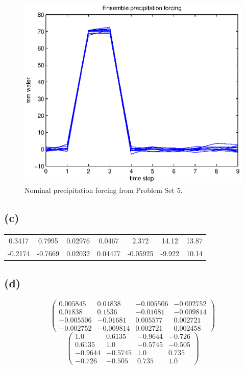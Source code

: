 \documentclass[letterpaper]{tufte-handout}
\begin{document}
    \begin{figure}
      \includegraphics[width=\textwidth]{1b}
      \caption{Nominal precipitation forcing from Problem Set 5.}
      \label{1b}
    \end{figure}
\subsection{(c)}
\begin{tabular}{ccccccc} 0.3417 & 0.7995 & 0.02976 & 0.0467 & 2.372 & 14.12 & 13.87\\ -0.2174 & -0.7669 & 0.02032 & 0.04477 & -0.05925 & -9.922 & 10.14 \end{tabular}

\subsection{(d)}
\[\left(\begin{array}{cccc} 0.005845 & 0.01838 & -0.005506 & -0.002752\\ 0.01838 & 0.1536 & -0.01681 & -0.009814\\ -0.005506 & -0.01681 & 0.005577 & 0.002721\\ -0.002752 & -0.009814 & 0.002721 & 0.002458 \end{array}\right)\]
\[\left(\begin{array}{cccc} 1.0 & 0.6135 & -0.9644 & -0.726\\ 0.6135 & 1.0 & -0.5745 & -0.505\\ -0.9644 & -0.5745 & 1.0 & 0.735\\ -0.726 & -0.505 & 0.735 & 1.0 \end{array}\right)\]
\end{document}
